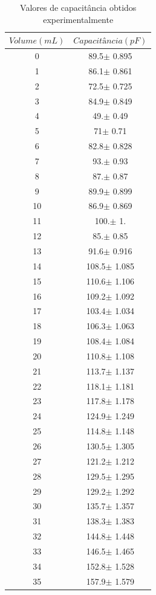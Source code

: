 \documentclass[a4paper]{instrumentacao}
\begin{document}
\begin{longtable}{cc}
\caption{Valores de capacitância obtidos experimentalmente} \label{tab:resultados-pluviometro-capacitancia} \\
\textbf{$Volume (mL)$} & \textbf{$Capacitância (pF)$} \\ \hline
 0 & 89.5$\pm$ 0.895 \\
 1 & 86.1$\pm$ 0.861 \\
 2 & 72.5$\pm$ 0.725 \\
 3 & 84.9$\pm$ 0.849 \\
 4 & 49.$\pm$ 0.49 \\
 5 & 71$\pm$ 0.71 \\
 6 & 82.8$\pm$ 0.828 \\
 7 & 93.$\pm$ 0.93 \\
 8 & 87.$\pm$ 0.87 \\
 9 & 89.9$\pm$ 0.899 \\
 10 & 86.9$\pm$ 0.869 \\
 11 & 100.$\pm$ 1. \\
 12 & 85.$\pm$ 0.85 \\
 13 & 91.6$\pm$ 0.916 \\
 14 & 108.5$\pm$ 1.085 \\
 15 & 110.6$\pm$ 1.106 \\
 16 & 109.2$\pm$ 1.092 \\
 17 & 103.4$\pm$ 1.034 \\
 18 & 106.3$\pm$ 1.063 \\
 19 & 108.4$\pm$ 1.084 \\
 20 & 110.8$\pm$ 1.108 \\
 21 & 113.7$\pm$ 1.137 \\
 22 & 118.1$\pm$ 1.181 \\
 23 & 117.8$\pm$ 1.178 \\
 24 & 124.9$\pm$ 1.249 \\
 25 & 114.8$\pm$ 1.148 \\
 26 & 130.5$\pm$ 1.305 \\
 27 & 121.2$\pm$ 1.212 \\
 28 & 129.5$\pm$ 1.295 \\
 29 & 129.2$\pm$ 1.292 \\
 30 & 135.7$\pm$ 1.357 \\
 31 & 138.3$\pm$ 1.383 \\
 32 & 144.8$\pm$ 1.448 \\
 33 & 146.5$\pm$ 1.465 \\
 34 & 152.8$\pm$ 1.528 \\
 35 & 157.9$\pm$ 1.579 \\

\end{longtable}
\end{document}
